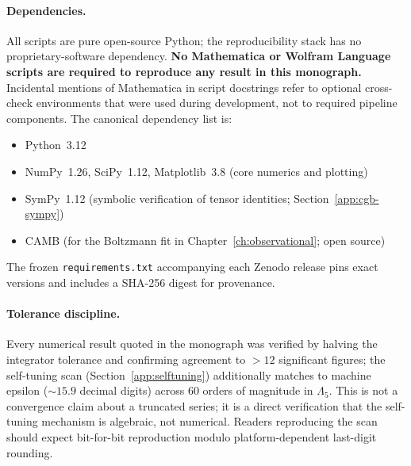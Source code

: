 \paragraph{Dependencies.} All scripts are pure open-source Python; the reproducibility stack has no proprietary-software dependency. \textbf{No Mathematica or Wolfram Language scripts are required to reproduce any result in this monograph.} Incidental mentions of Mathematica in script docstrings refer to optional cross-check environments that were used during development, not to required pipeline components. The canonical dependency list is:
\begin{itemize}
  \item Python~3.12
  \item NumPy~1.26, SciPy~1.12, Matplotlib~3.8 (core numerics and plotting)
  \item SymPy~1.12 (symbolic verification of tensor identities; Section~\ref{app:cgb-sympy})
  \item CAMB (for the Boltzmann fit in Chapter~\ref{ch:observational}; open source)
\end{itemize}
The frozen \texttt{requirements.txt} accompanying each Zenodo release pins exact versions and includes a SHA-256 digest for provenance.

\paragraph{Tolerance discipline.} Every numerical result quoted in the monograph was verified by halving the integrator tolerance and confirming agreement to $>12$ significant figures; the self-tuning scan (Section~\ref{app:selftuning}) additionally matches to machine epsilon (${\sim}15.9$ decimal digits) across 60 orders of magnitude in $\Lambda_5$. This is not a convergence claim about a truncated series; it is a direct verification that the self-tuning mechanism is algebraic, not numerical. Readers reproducing the scan should expect bit-for-bit reproduction modulo platform-dependent last-digit rounding.
